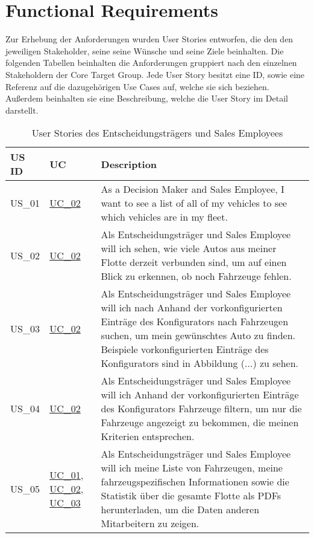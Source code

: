 \chapter{Functional Requirements}
Zur Erhebung der Anforderungen wurden User Stories entworfen, die den den jeweiligen Stakeholder, seine seine Wünsche und seine Ziele beinhalten. Die folgenden Tabellen beinhalten die Anforderungen gruppiert nach den einzelnen Stakeholdern der Core Target Group. Jede User Story besitzt eine ID, sowie eine Referenz auf die dazugehörigen Use Cases auf, welche sie sich beziehen. Außerdem beinhalten sie eine Beschreibung, welche die User Story im Detail darstellt.
  \sffamily
  \begin{footnotesize}
    \begin{longtable}[L L L]{ p{} p{} p{} }
      \caption                       %
          {User Stories des Entscheidungsträgers und Sales Employees} %
          \\
      \toprule
      \textbf{US ID} & \textbf{UC} & \textbf{Description} \\
      \midrule
      \hypertarget{Ref:US1}{US\_01} & \hyperlink{Ref:UC2}{UC\_02} & As a Decision Maker and Sales Employee, I want to see a list of all of my vehicles to see which vehicles are in my fleet. \\ 
      \hypertarget{Ref:US2}{US\_02} & \hyperlink{Ref:UC2}{UC\_02} & Als Entscheidungsträger und Sales Employee will ich sehen, wie viele Autos aus meiner Flotte derzeit verbunden sind, um auf einen Blick zu erkennen, ob noch Fahrzeuge fehlen. \\
      \hypertarget{Ref:US3}{US\_03} & \hyperlink{Ref:UC2}{UC\_02} & Als Entscheidungsträger und Sales Employee will ich nach Anhand der vorkonfigurierten Einträge des Konfigurators nach Fahrzeugen suchen, um mein gewünschtes Auto zu finden. 
      Beispiele vorkonfigurierten Einträge des Konfigurators sind in Abbildung (...) zu sehen.
      \\
      \hypertarget{Ref:US4}{US\_04} & \hyperlink{Ref:UC2}{UC\_02} & Als Entscheidungsträger und Sales Employee will ich Anhand der vorkonfigurierten Einträge des Konfigurators Fahrzeuge filtern, um nur die Fahrzeuge angezeigt zu bekommen, die meinen Kriterien entsprechen. \\
      \hypertarget{Ref:US5}{US\_05} & \hyperlink{Ref:UC1}{UC\_01}, \newline \hyperlink{Ref:UC2}{UC\_02}, \newline \hyperlink{Ref:UC3}{UC\_03} & Als Entscheidungsträger und Sales Employee will ich meine Liste von Fahrzeugen, meine fahrzeugspezifischen Informationen sowie die Statistik über die gesamte Flotte als PDFs herunterladen, um die Daten anderen Mitarbeitern zu zeigen. \\

\end{longtable}
\end{footnotesize}
